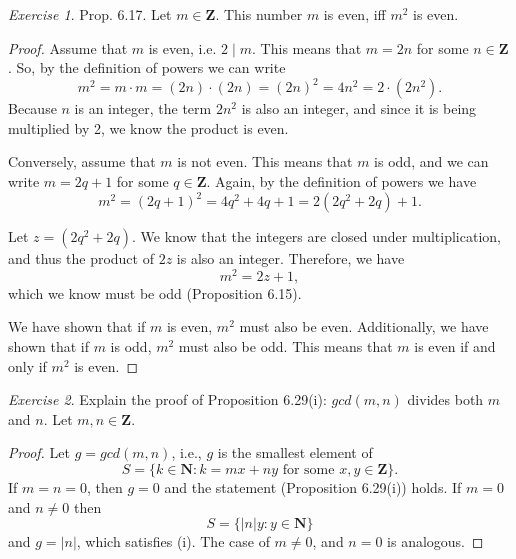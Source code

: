 \documentclass[12pt,oneside]{amsart}
\theoremstyle{remark}
\newtheorem{exer}{Exercise}
\newcommand{\bfN}{\mathbf{N}}
\newcommand{\bfZ}{\mathbf{Z}}
\begin{document}
%
%
%
%
\newpage
\begin{exer}
Prop. 6.17. Let $m \in \bfZ$. This number $m$ is even, iff $m^2$ is even.
\end{exer}

%
\begin{proof}
Assume that $m$ is even, i.e. $2 \mid m$. This means that $m = 2n$ for some $n \in \bfZ$. So, by the definition of powers we can write \[ m^2 = m \cdot m = (2n) \cdot (2n) = (2n)^2 = 4n^2 = 2 \cdot (2n^2). \] Because $n$ is an integer, the term $2n^2$ is also an integer, and since it is being multiplied by 2, we know the product is even.

Conversely, assume that $m$ is not even. This means that $m$ is odd, and we can write $m = 2q + 1$ for some $q \in \bfZ$. Again, by the definition of powers we have \[ m^2 = (2q + 1)^2 = 4q^2 + 4q + 1 = 2(2q^2 + 2q) + 1. \]

Let $z = (2q^2 + 2q)$. We know that the integers are closed under multiplication, and thus the product of $2z$ is also an integer. Therefore, we have \[ m^2 = 2z +1, \] which we know must be odd (Proposition 6.15).

We have shown that if $m$ is even, $m^2$ must also be even. Additionally, we have shown that if $m$ is odd, $m^2$ must also be odd. This means that $m$ is even if and only if $m^2$ is even.
\end{proof}

%
%
%
%
\newpage
\begin{exer}
Explain the proof of Proposition 6.29(i): $gcd(m, n)$ divides both $m$ and $n$. Let $m,n \in \bfZ$. %
\end{exer}

\begin{proof}
Let $g = gcd(m, n)$, i.e., $g$ is the smallest element of \[ S = \{k \in \bfN : k = mx + ny \text{ for some } x,y \in \bfZ \}. \] If $m = n = 0$, then $g = 0$ and the statement (Proposition 6.29(i)) holds. If $m = 0$ and $n \neq 0$ then \[ S = \{ |n|y : y \in \bfN \} \] and $g = |n|$, which satisfies (i). The case of $m \neq 0$, and $n = 0$ is analogous.
\end{proof}
\end{document}
